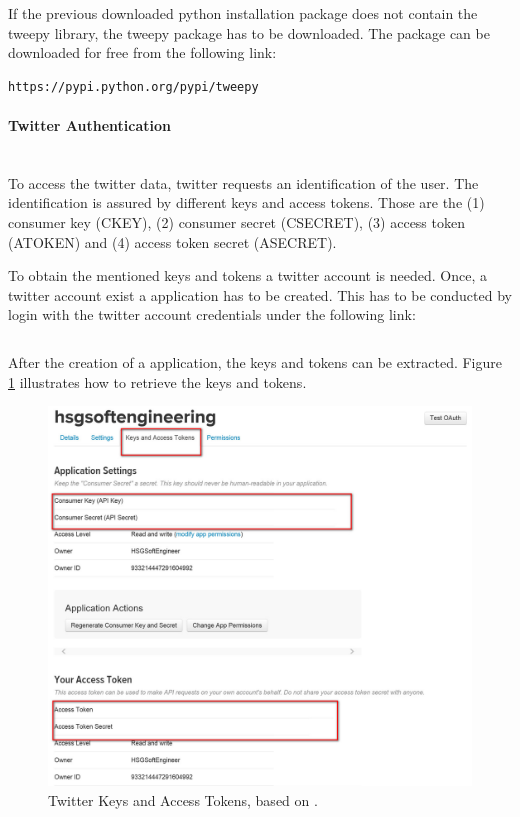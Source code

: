 \documentclass[a4paper,12pt]{article}
\begin{document}
\begin{spacing}{1.2}
If the previous downloaded python installation package does not contain the tweepy library, the tweepy package has to be downloaded. The package can be downloaded for free from the following link:
\begin{lstlisting}[language=bash]
https://pypi.python.org/pypi/tweepy
\end{lstlisting}

\paragraph{Twitter Authentication}\mbox{}\\{}
To access the twitter data, twitter requests an identification of the user. The identification is assured by different keys and access tokens. Those are the (1) consumer key (CKEY), (2) consumer secret (CSECRET), (3) access token (ATOKEN) and (4) access token secret (ASECRET). \parencite{twitterinc2017b}

To obtain the mentioned keys and tokens a twitter account is needed. Once, a twitter account exist a application has to be created. This has to be conducted by login with the twitter account credentials under the following link: 
\begin{lstlisting}[language=bash]
%https://apps.twitter.com/
\end{lstlisting}

After the creation of a application, the keys and tokens can be extracted. Figure \ref{figkeysandtokens} illustrates how to retrieve the keys and tokens.\\
\begin{figure}[H]
\centering
\includegraphics[scale=0.6]{twitteraccess}
\caption{Twitter Keys and Access Tokens, based on \textcite{twitterinc2017c}.}
\label{figkeysandtokens}
\end{figure}


\end{spacing}
\end{document}
